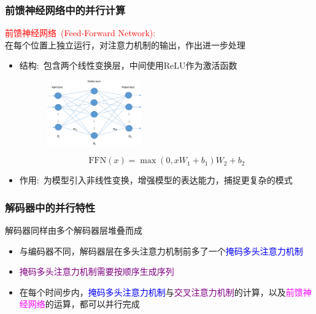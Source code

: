 \begin{frame}
    \frametitle{前馈神经网络中的并行计算}
\textcolor{red}{前馈神经网络~\textrm{(Feed-Forward Network):}}\\
    在每个位置上独立运行，对注意力机制的输出，作出进一步处理
    \begin{itemize}
		\setlength{\itemsep}{3pt}
	    \item 结构:~包含两个线性变换层，中间使用\textrm{ReLU}作为激活函数
\begin{figure}[h!]
\vspace*{-0.05in}
\centering
\includegraphics[height=1.1in, width=1.7in, viewport=0 0 720 499, clip]{Figures/Transformer_FFNN.png}
\label{Transformer_FFNN}
\end{figure}
		    \begin{displaymath}
			     \mathrm{FFN}(x) = \max(0, x W_1 + b_1) W_2 + b_2 
		    \end{displaymath}
		    {\fontsize{7.2pt}{6.2pt}\selectfont{其中$W_1$, $W_2$是权重矩阵，$b_1$, $b_2$是偏置向量}}
{\fontsize{7.2pt}{6.2pt}}
        \item 作用:~为模型引入非线性变换，增强模型的表达能力，捕捉更复杂的模式
    \end{itemize}
\end{frame}

\begin{frame}
    \frametitle{解码器中的并行特性}
    解码器同样由多个解码器层堆叠而成
    \begin{itemize}
		\setlength{\itemsep}{10pt}
		\item 与编码器不同，解码器层在多头注意力机制前多了一个\textcolor{blue}{掩码多头注意力机制}
		\item \textcolor{purple}{掩码多头注意力机制需要按顺序生成序列}
		\item 在每个时间步内，\textcolor{blue}{掩码多头注意力机制}与\textcolor{purple}{交叉注意力机制}的计算，以及\textcolor{magenta}{前馈神经网络}的运算，都可以并行完成
    \end{itemize}
\end{frame}

